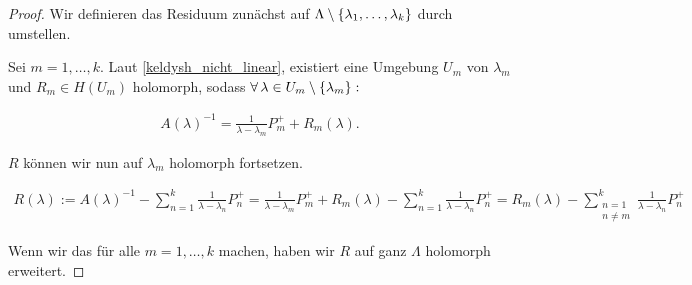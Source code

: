 \begin{proof}

    Wir definieren das Residuum zunächst auf $\Lambda \setminus {\left \{ \lambda_1, \dots, \lambda_k \right \}}$ durch umstellen.

    Sei $m = 1, \dots, k$.
    Laut \ref{keldysh_nicht_linear}, existiert eine Umgebung $U_m$ von $\lambda_m$ und $R_m \in H(U_m)$ holomorph, sodass $\forall \, \lambda \in U_m \setminus {\left \{ \lambda_m \right \}}:$

    \begin{align*}
        A(\lambda)^{-1}
        =
        \frac{1}{\lambda - \lambda_m} P_m^+
        +
        R_m(\lambda).
    \end{align*}

    $R$ können wir nun auf $\lambda_m$ holomorph fortsetzen.

    \begin{align*}
        R(\lambda)
        :=
        A(\lambda)^{-1}
        -
        \sum_{n=1}^k
            \frac{1}{\lambda - \lambda_n} P_n^+
        =
        \frac{1}{\lambda - \lambda_m} P_m^+
        +
        R_m(\lambda)
        -
        \sum_{n=1}^k
            \frac{1}{\lambda - \lambda_n} P_n^+
        =
        R_m(\lambda)
        -
        \sum_{\substack{n = 1 \\ n \neq m}}^k
            \frac{1}{\lambda - \lambda_n} P_n^+
    \end{align*}

    Wenn wir das für alle $m = 1, \dots, k$ machen, haben wir $R$ auf ganz $\Lambda$ holomorph erweitert.

\end{proof}